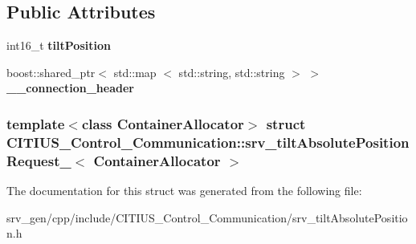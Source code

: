 \subsection*{\-Public \-Attributes}
\begin{DoxyCompactItemize}
\item 
\hypertarget{struct_c_i_t_i_u_s___control___communication_1_1srv__tilt_absolute_position_request___ad6c82eaff337679949406ecd69c6167e}{int16\-\_\-t {\bfseries tilt\-Position}}\label{struct_c_i_t_i_u_s___control___communication_1_1srv__tilt_absolute_position_request___ad6c82eaff337679949406ecd69c6167e}

\item 
\hypertarget{struct_c_i_t_i_u_s___control___communication_1_1srv__tilt_absolute_position_request___ad9c1ad8c31faacfbe558cd682c8cdfbe}{boost\-::shared\-\_\-ptr$<$ std\-::map\*
$<$ std\-::string, std\-::string $>$ $>$ {\bfseries \-\_\-\-\_\-connection\-\_\-header}}\label{struct_c_i_t_i_u_s___control___communication_1_1srv__tilt_absolute_position_request___ad9c1ad8c31faacfbe558cd682c8cdfbe}

\end{DoxyCompactItemize}
\subsubsection*{template$<$class Container\-Allocator$>$ struct C\-I\-T\-I\-U\-S\-\_\-\-Control\-\_\-\-Communication\-::srv\-\_\-tilt\-Absolute\-Position\-Request\-\_\-$<$ Container\-Allocator $>$}



\-The documentation for this struct was generated from the following file\-:\begin{DoxyCompactItemize}
\item 
srv\-\_\-gen/cpp/include/\-C\-I\-T\-I\-U\-S\-\_\-\-Control\-\_\-\-Communication/srv\-\_\-tilt\-Absolute\-Position.\-h\end{DoxyCompactItemize}
